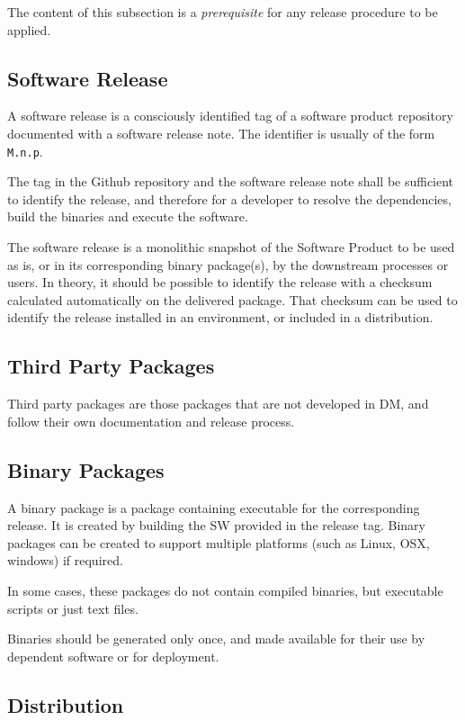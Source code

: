 The content of this subsection is a \textit{prerequisite} for any release procedure to be applied.


\subsection{Software Release} \label{sec:defrelease}

A software release is a consciously identified tag of a software product repository documented with a software release note.
The identifier is usually of the form \texttt{M.n.p}.

The tag in the Github repository and the software release note shall be sufficient to identify the release, and therefore for a developer
to resolve the dependencies, build the binaries and execute the software.

The software release is a monolithic snapshot of the Software Product to be used as is, or in its corresponding binary package(s), by the downstream processes or users.
In theory, it should be possible to identify the release with a checksum calculated automatically on the delivered package.
That checksum can be used to identify the release installed in an environment, or included in a distribution.


\subsection{Third Party Packages}

Third party packages are those packages that are not developed in DM, and follow their own documentation and release process.


\subsection{Binary Packages} \label{sec:swbpkg}

A binary package is a package containing executable for the corresponding release.
It is created by building the SW provided in the release tag.
Binary packages can be created to support multiple platforms (such as Linux, OSX, windows) if required.

In some cases, these packages do not contain compiled binaries, but executable scripts or just text files.

Binaries should be generated only once, and made available for their use by dependent software or for deployment.


\subsection{Distribution} \label{sec:distribution}

